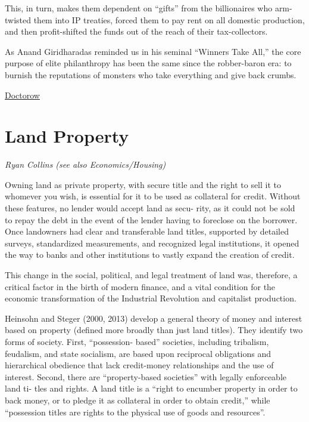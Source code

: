 \documentclass[
]{book}
\begin{document}
This, in turn, makes them dependent on ``gifts'' from the billionaires who arm-twisted them into IP treaties, forced them to pay rent on all domestic production, and then profit-shifted the funds out of the reach of their tax-collectors.

As Anand Giridharadas reminded us in his seminal ``Winners Take All,'' the core purpose of elite philanthropy has been the same since the robber-baron era: to burnish the reputations of monsters who take everything and give back crumbs.

\href{https://pluralistic.net/2021/04/13/public-interest-pharma/\#gates-foundation}{Doctorow}

\hypertarget{land-property}{%
\section{Land Property}\label{land-property}}

\emph{Ryan Collins (see also Economics/Housing)}

Owning land as private property, with secure title and the right to sell
it to whomever you wish, is essential for it to be used as collateral for
credit. Without these features, no lender would accept land as secu-
rity, as it could not be sold to repay the debt in the event of the lender
having to foreclose on the borrower. Once landowners had clear and
transferable land titles, supported by detailed surveys, standardized
measurements, and recognized legal institutions, it opened the way
to banks and other institutions to vastly expand the creation of credit.

This change in the social, political, and legal treatment of land was,
therefore, a critical factor in the birth of modern finance, and a
vital condition for the economic transformation of the Industrial
Revolution and capitalist production.

Heinsohn and Steger (2000, 2013) develop a general theory of
money and interest based on property (defined more broadly than
just land titles). They identify two forms of society. First, ``possession-­
based'' societies, including tribalism, feudalism, and state socialism,
are based upon reciprocal obligations and hierarchical obedience
that lack credit-­money relationships and the use of interest. Second,
there are ``property-­based societies'' with legally enforceable land ti-
tles and rights. A land title is a ``right to encumber property in order
to back money, or to pledge it as collateral in order to obtain credit,''
while ``possession titles are rights to the physical use of goods and
resources''.
\end{document}
